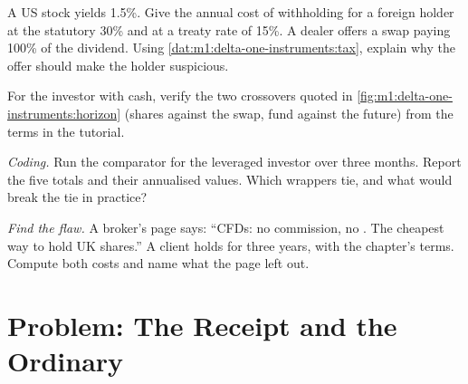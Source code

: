 \begin{exercise}[$\star\star$]\label{exo:m1:delta-one-instruments:5}
A US stock yields 1.5\%. Give the annual cost of withholding for a foreign
holder at the statutory 30\% and at a treaty rate of 15\%. A dealer offers a
swap paying 100\% of the dividend. Using
\cref{dat:m1:delta-one-instruments:tax}, explain why the offer should make the
holder suspicious.
\end{exercise}

\begin{exercise}[$\star\star$]\label{exo:m1:delta-one-instruments:6}
For the investor with cash, verify the two crossovers quoted in
\cref{fig:m1:delta-one-instruments:horizon} (shares against the swap, fund
against the future) from the terms in the tutorial.
\end{exercise}

\begin{exercise}[$\star\star\star$]\label{exo:m1:delta-one-instruments:7}
\emph{Coding.} Run the comparator for the leveraged investor over three
months. Report the five totals and their annualised values. Which wrappers
tie, and what would break the tie in practice?
\end{exercise}

\begin{exercise}[$\star\star\star$]\label{exo:m1:delta-one-instruments:8}
\emph{Find the flaw.} A broker's page says: ``CFDs: no commission, no . The cheapest way to hold UK shares.'' A client holds for three years,
with the chapter's terms. Compute both costs and name what the page left out.
\end{exercise}

\section{Problem: The Receipt and the Ordinary}

